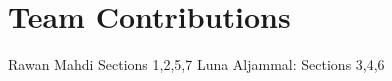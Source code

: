 \documentclass[11pt]{article}
\begin{document}

\section*{Team Contributions}
Rawan Mahdi Sections 1,2,5,7
Luna Aljammal: Sections 3,4,6

%





\end{document}
